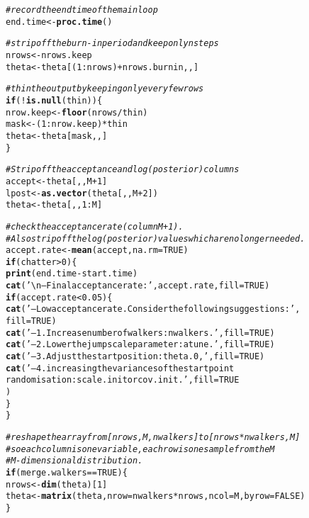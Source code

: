 \documentclass{article}\usepackage[]{graphicx}\usepackage[]{color}
\makeatletter
\newcommand{\hlnum}[1]{\textcolor[rgb]{0.686,0.059,0.569}{#1}}%
\newcommand{\hlstr}[1]{\textcolor[rgb]{0.192,0.494,0.8}{#1}}%
\newcommand{\hlcom}[1]{\textcolor[rgb]{0.678,0.584,0.686}{\textit{#1}}}%
\newcommand{\hlopt}[1]{\textcolor[rgb]{0,0,0}{#1}}%
\newcommand{\hlstd}[1]{\textcolor[rgb]{0.345,0.345,0.345}{#1}}%
\newcommand{\hlkwa}[1]{\textcolor[rgb]{0.161,0.373,0.58}{\textbf{#1}}}%
\newcommand{\hlkwb}[1]{\textcolor[rgb]{0.69,0.353,0.396}{#1}}%
\newcommand{\hlkwc}[1]{\textcolor[rgb]{0.333,0.667,0.333}{#1}}%
\newcommand{\hlkwd}[1]{\textcolor[rgb]{0.737,0.353,0.396}{\textbf{#1}}}%
\newenvironment{kframe}{%
 \def\at@end@of@kframe{}%
 \ifinner\ifhmode%
  \def\at@end@of@kframe{\end{minipage}}%
  \begin{minipage}{\columnwidth}%
 \fi\fi%
 \def\FrameCommand##1{\hskip\@totalleftmargin \hskip-\fboxsep
 \colorbox{shadecolor}{##1}\hskip-\fboxsep
     \hskip-\linewidth \hskip-\@totalleftmargin \hskip\columnwidth}%
 \MakeFramed {\advance\hsize-\width
   \@totalleftmargin\z@ \linewidth\hsize
   \@setminipage}}%
 {\par\unskip\endMakeFramed%
 \at@end@of@kframe}
\newenvironment{knitrout}{}{} %
\makeatother
\begin{document}
\begin{knitrout}
\begin{kframe}
\begin{alltt}
  \hlcom{# record the end time of the main loop}
  \hlstd{end.time} \hlkwb{<-} \hlkwd{proc.time}\hlstd{()}

  \hlcom{# strip off the burn-in period and keep only nsteps }
  \hlstd{nrows} \hlkwb{<-} \hlstd{nrows.keep}
  \hlstd{theta} \hlkwb{<-} \hlstd{theta[(}\hlnum{1}\hlopt{:}\hlstd{nrows)} \hlopt{+} \hlstd{nrows.burnin, , ]}

  \hlcom{# thin the output by keeping only every few rows}
  \hlkwa{if} \hlstd{(}\hlopt{!}\hlkwd{is.null}\hlstd{(thin)) \{}
    \hlstd{nrow.keep} \hlkwb{<-} \hlkwd{floor}\hlstd{(nrows} \hlopt{/} \hlstd{thin)}
    \hlstd{mask} \hlkwb{<-} \hlstd{(}\hlnum{1}\hlopt{:}\hlstd{nrow.keep)} \hlopt{*} \hlstd{thin}
    \hlstd{theta} \hlkwb{<-} \hlstd{theta[mask,,]}
  \hlstd{\}}

  \hlcom{# Strip off the acceptance and log(posterior) columns }
  \hlstd{accept} \hlkwb{<-} \hlstd{theta[, , M}\hlopt{+}\hlnum{1}\hlstd{]}
  \hlstd{lpost} \hlkwb{<-} \hlkwd{as.vector}\hlstd{( theta[, , M}\hlopt{+}\hlnum{2}\hlstd{])}
  \hlstd{theta} \hlkwb{<-} \hlstd{theta[, ,} \hlnum{1}\hlopt{:}\hlstd{M]}

  \hlcom{# check the acceptance rate (column M+1).}
  \hlcom{# Also strip off the log(posterior) values which are no longer needed.}
  \hlstd{accept.rate} \hlkwb{<-} \hlkwd{mean}\hlstd{(accept,} \hlkwc{na.rm} \hlstd{=} \hlnum{TRUE}\hlstd{)}
  \hlkwa{if} \hlstd{(chatter} \hlopt{>} \hlnum{0}\hlstd{) \{}
    \hlkwd{print}\hlstd{(end.time} \hlopt{-} \hlstd{start.time)}
    \hlkwd{cat}\hlstd{(}\hlstr{'\textbackslash{}n-- Final acceptance rate: '}\hlstd{, accept.rate,} \hlkwc{fill} \hlstd{=} \hlnum{TRUE}\hlstd{)}
    \hlkwa{if} \hlstd{(accept.rate} \hlopt{<} \hlnum{0.05}\hlstd{) \{}
      \hlkwd{cat}\hlstd{(}\hlstr{'-- Low acceptance rate. Consider the following suggestions:'}\hlstd{,}
          \hlkwc{fill} \hlstd{=} \hlnum{TRUE}\hlstd{)}
      \hlkwd{cat}\hlstd{(}\hlstr{'-- 1. Increase number of walkers: nwalkers.'}\hlstd{,} \hlkwc{fill} \hlstd{=} \hlnum{TRUE}\hlstd{)}
      \hlkwd{cat}\hlstd{(}\hlstr{'-- 2. Lower the jump scale parameter: atune.'}\hlstd{,} \hlkwc{fill} \hlstd{=} \hlnum{TRUE}\hlstd{)}
      \hlkwd{cat}\hlstd{(}\hlstr{'-- 3. Adjust the start position: theta.0,'}\hlstd{,} \hlkwc{fill} \hlstd{=} \hlnum{TRUE}\hlstd{)}
      \hlkwd{cat}\hlstd{(}\hlstr{'-- 4. increasing the variances of the start point 
           randomisation: scale.init or cov.init.'}\hlstd{,} \hlkwc{fill} \hlstd{=} \hlnum{TRUE}
      \hlstd{)}
    \hlstd{\}}
  \hlstd{\}}

  \hlcom{# reshape the array from [nrows, M, nwalkers] to [nrows*nwalkers, M]}
  \hlcom{# so each column is one variable, each row is one sample from the M}
  \hlcom{# M-dimensional distribution.}
  \hlkwa{if} \hlstd{(merge.walkers} \hlopt{==} \hlnum{TRUE}\hlstd{) \{}
    \hlstd{nrows} \hlkwb{<-} \hlkwd{dim}\hlstd{(theta)[}\hlnum{1}\hlstd{]}
    \hlstd{theta} \hlkwb{<-} \hlkwd{matrix}\hlstd{(theta,} \hlkwc{nrow} \hlstd{= nwalkers} \hlopt{*} \hlstd{nrows,} \hlkwc{ncol} \hlstd{= M,} \hlkwc{byrow} \hlstd{=} \hlnum{FALSE}\hlstd{)}
  \hlstd{\}}


\end{alltt}
\end{kframe}
\end{knitrout}
\end{document}
